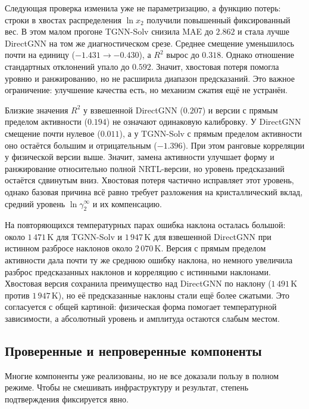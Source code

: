 \documentclass[11pt]{article}
\newcommand{\Rtwo}{R^2}
\theoremstyle{definition}
\begin{document}
Следующая проверка изменила уже не параметризацию, а функцию потерь: строки в хвостах распределения \(\ln x_2\) получили повышенный фиксированный вес. В этом малом прогоне TGNN-Solv снизила MAE до $2.862$ и стала лучше DirectGNN на том же диагностическом срезе. Среднее смещение уменьшилось почти на единицу ($-1.431\to-0.430$), а \(\Rtwo\) вырос до $0.318$. Однако отношение стандартных отклонений упало до $0.592$. Значит, хвостовая потеря помогла уровню и ранжированию, но не расширила диапазон предсказаний. Это важное ограничение: улучшение качества есть, но механизм сжатия ещё не устранён.

Близкие значения $\Rtwo$ у взвешенной DirectGNN ($0.207$) и версии с прямым пределом активности ($0.194$) не означают одинаковую калибровку. У DirectGNN смещение почти нулевое ($0.011$), а у TGNN-Solv с прямым пределом активности оно остаётся большим и отрицательным ($-1.396$). При этом ранговые корреляции у физической версии выше. Значит, замена активности улучшает форму и ранжирование относительно полной NRTL-версии, но уровень предсказаний остаётся сдвинутым вниз. Хвостовая потеря частично исправляет этот уровень, однако базовая причина всё равно требует разложения на кристаллический вклад, средний уровень \(\ln\gamma_2^\infty\) и их компенсацию.

На повторяющихся температурных парах ошибка наклона осталась большой: около \(1\,471\,\mathrm K\) для TGNN-Solv и \(1\,947\,\mathrm K\) для взвешенной DirectGNN при истинном разбросе наклонов около \(2\,070\,\mathrm K\). Версия с прямым пределом активности дала почти ту же среднюю ошибку наклона, но немного увеличила разброс предсказанных наклонов и корреляцию с истинными наклонами. Хвостовая версия сохранила преимущество над DirectGNN по наклону (\(1\,491\,\mathrm K\) против \(1\,947\,\mathrm K\)), но её предсказанные наклоны стали ещё более сжатыми. Это согласуется с общей картиной: физическая форма помогает температурной зависимости, а абсолютный уровень и амплитуда остаются слабым местом.

\subsection{Проверенные и непроверенные компоненты}

Многие компоненты уже реализованы, но не все доказали пользу в полном режиме. Чтобы не смешивать инфраструктуру и результат, степень подтверждения фиксируется явно.
\end{document}
